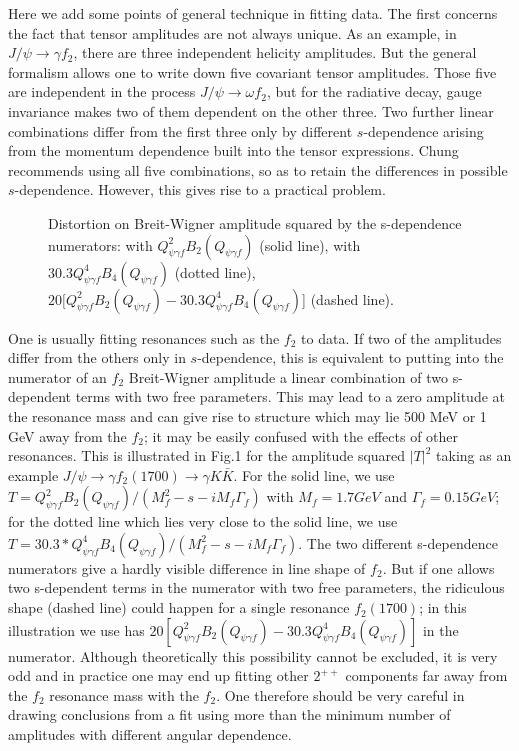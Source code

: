 Here we add some points of general technique in fitting data. The
first concerns the fact that tensor amplitudes are not always
unique. As an example, in $J/\psi \to \gamma f_2$, there are three
independent helicity amplitudes. But the general formalism allows
one to write down five covariant tensor amplitudes. Those five are
independent in the process $J/\psi \to \omega f_2$, but for the
radiative decay, gauge invariance makes two of them dependent on
the other three. Two further linear combinations differ from the
first three only by different $s$-dependence arising from the
momentum dependence built into the tensor expressions. Chung
\cite{Chung} recommends using all five combinations, so as to
retain the differences in possible $s$-dependence. However, this
gives rise to a practical problem.

\begin{figure}[htbp]
\begin{center}
\epsfysize=8.0cm 
\end{center}
\caption{\label{ptest} Distortion on Breit-Wigner amplitude
squared by the s-dependence numerators: with $Q_{\psi\gamma f}^2
B_2(Q_{\psi\gamma f})$ (solid line), with $30.3Q_{\psi\gamma f}^4
B_4(Q_{\psi\gamma f})$ (dotted line), $20[Q_{\psi\gamma f}^2
B_2(Q_{\psi\gamma f})-30.3Q_{\psi\gamma f}^4 B_4(Q_{\psi\gamma
f})$] (dashed line).}
\end{figure}

One is usually fitting resonances such as the $f_2$ to data. If
two of the amplitudes differ from the others only in
$s$-dependence, this is equivalent to putting into the numerator
of an $f_2$ Breit-Wigner amplitude a linear combination of two
s-dependent terms with two free parameters. This may lead to a
zero amplitude at the resonance mass and can give rise to
structure which may lie 500 MeV or 1 GeV away from the $f_2$; it
may be easily confused with the effects of other resonances. This
is illustrated in Fig.1 for the amplitude squared $|T|^2$ taking
as an example $J/\psi\to\gamma f_2(1700)\to\gamma K\bar K$. For
the solid line, we use $T=Q_{\psi\gamma f}^2B_2(Q_{\psi\gamma
f})/(M^2_f-s-iM_f\Gamma_f)$ with $M_f=1.7 GeV$ and $\Gamma_f=0.15
GeV$; for the dotted line which lies very close to the solid line,
we use $T=30.3*Q_{\psi\gamma f}^4B_4(Q_{\psi\gamma
f})/(M^2_f-s-iM_f\Gamma_f)$. The two different s-dependence
numerators give a hardly visible difference in line shape of
$f_2$. But if one allows two s-dependent terms in the numerator
with two free parameters, the ridiculous shape (dashed line) could
happen for a single resonance $f_2(1700)$; in this illustration we
use has $20[Q_{\psi\gamma f}^2 B_2(Q_{\psi\gamma f})-
30.3Q_{\psi\gamma f}^4 B_4(Q_{\psi\gamma f})]$ in the numerator.
Although theoretically this possibility cannot be excluded, it is
very odd and in practice one may end up fitting other $2^{++}$
components far away from the $f_2$ resonance mass with the $f_2$.
One therefore should be very careful in drawing conclusions from a
fit using more than the minimum number of amplitudes with
different angular dependence.

